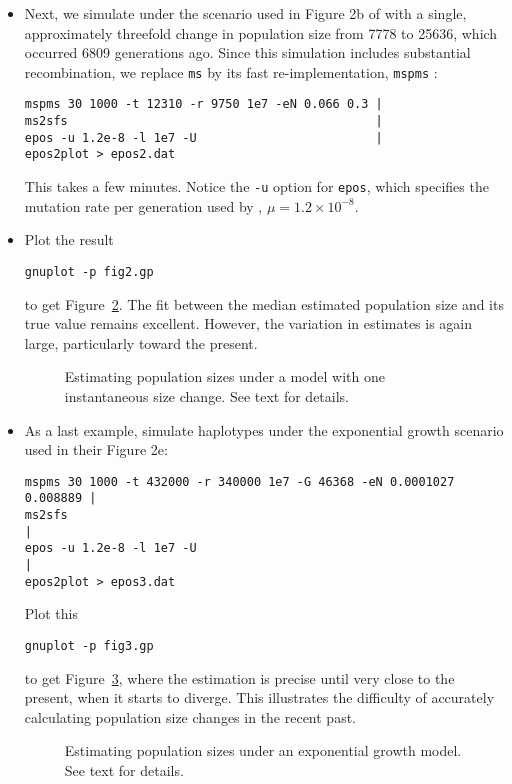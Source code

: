 \documentclass[a4paper, english]{article}
\newcommand{\ty}{\texttt}
\begin{document}
\begin{itemize}
\begin{figure}
{  text.}\label{fig:con}
\end{figure}
\item Next, we simulate under the scenario used in Figure 2b of \cite{liu15:exp}
  with a single, approximately threefold change in population size
  from 7778 to 25636, which occurred 6809 generations ago. Since this simulation includes substantial recombination, we
  replace \ty{ms} by its fast re-implementation, \ty{mspms}
  \citep{kel16:eff}:
\begin{verbatim}
mspms 30 1000 -t 12310 -r 9750 1e7 -eN 0.066 0.3 |
ms2sfs                                           |
epos -u 1.2e-8 -l 1e7 -U                         |
epos2plot > epos2.dat
\end{verbatim}
This takes a few minutes. Notice the \ty{-u} option for \ty{epos},
which specifies the mutation rate per generation used by \cite{liu15:exp}, $\mu=1.2\times
10^{-8}$.
\item Plot the result
\begin{verbatim}
gnuplot -p fig2.gp
\end{verbatim}
to get Figure~\ref{fig:2b}. The fit between the median estimated
population size and its true value remains excellent. However, the
variation in estimates is again large, particularly toward the present.
\begin{figure}
  \begin{center}
    \scalebox{0.6}{}
  \end{center}
  \caption{Estimating population sizes under a model with one
    instantaneous size change. See text for details.}\label{fig:2b}
\end{figure}
\item As a last example, simulate haplotypes under
  the exponential growth scenario \cite{liu15:exp} used in their
  Figure 2e:
    \small
\begin{verbatim}
mspms 30 1000 -t 432000 -r 340000 1e7 -G 46368 -eN 0.0001027 0.008889 |
ms2sfs                                                                |
epos -u 1.2e-8 -l 1e7 -U                                              |
epos2plot > epos3.dat
\end{verbatim}
\normalsize
Plot this
\begin{verbatim}
gnuplot -p fig3.gp
\end{verbatim}
to get Figure~\ref{fig:2e}, where the estimation is precise until very
close to the present, when it starts to diverge. This illustrates
the difficulty of accurately calculating population size changes
in the recent past.
\begin{figure}
  \begin{center}
    \scalebox{0.6}{}
  \end{center}
  \caption{Estimating population sizes under an exponential growth
    model. See text for details.}\label{fig:2e}
\end{figure}
\end{itemize}
\end{document}
